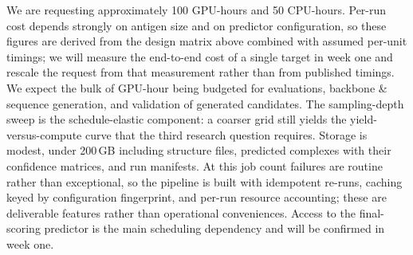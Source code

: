 \noindent We are requesting approximately 100 GPU-hours and 50 CPU-hours.  Per-run cost depends strongly on antigen size and on predictor configuration, so these figures are derived from the design matrix above combined with assumed per-unit timings; we will measure the end-to-end cost of a single target in week one and rescale the request from that measurement rather than from published timings. We expect the bulk of GPU-hour being budgeted for evaluations, backbone \& sequence generation, and validation of generated candidates. The sampling-depth sweep is the schedule-elastic component: a coarser grid still yields the yield-versus-compute curve that the third research question requires. Storage is modest, under 200\,GB including structure files, predicted complexes with their confidence matrices, and run manifests. At this job count failures are routine rather than exceptional, so the pipeline is built with idempotent re-runs, caching keyed by configuration fingerprint, and per-run resource accounting; these are deliverable features rather than operational conveniences. Access to the final-scoring predictor is the main scheduling dependency and will be confirmed in week one.

